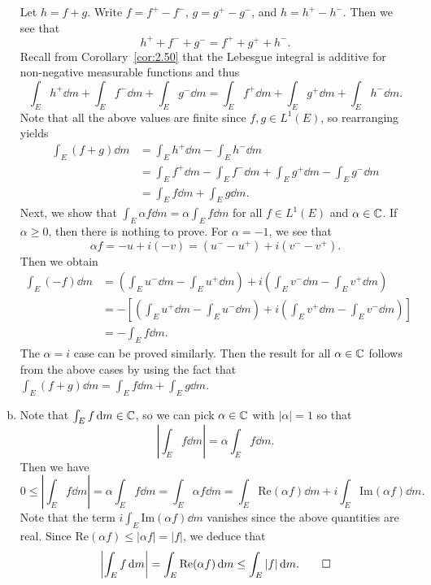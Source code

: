 \begin{pf}
\begin{enumerate}[(a)]
        Let $h = f + g$. Write $f = f^+ - f^-$, $g = g^+ - g^-$, and 
        $h = h^+ - h^-$. Then we see that 
        \[ h^+ + f^- + g^- = f^+ + g^+ + h^-. \]
        Recall from Corollary~\ref{cor:2.50} that the Lebesgue integral 
        is additive for non-negative measurable functions and thus 
        \[ \int_E h^+\dd m + \int_E f^-\dd m + \int_E g^- \dd m 
        = \int_E f^+\dd m + \int_E g^+\dd m + \int_E h^-\dd m. \] 
        Note that all the above values are finite since $f, g \in L^1(E)$, 
        so rearranging yields 
        \begin{align*}
            \int_E (f+g)\dd m 
            &= \int_E h^+\dd m - \int_E h^-\dd m \\
            &= \int_E f^+\dd m - \int_E f^-\dd m + \int_E g^+\dd m - \int_E g^-\dd m \\ 
            &= \int_E f\dd m + \int_E g\dd m.
        \end{align*}
        Next, we show that $\int_E \alpha f \dd m = \alpha \int_E f\dd m$
        for all $f \in L^1(E)$ and $\alpha \in \mathbb{C}$. If $\alpha \geq 0$, 
        then there is nothing to prove. For $\alpha = -1$, we see that 
        \[ \alpha f = -u + i(-v) = (u^- - u^+) + i(v^- - v^+). \] 
        Then we obtain 
        \begin{align*}
            \int_E (-f)\dd m 
            &= \left( \int_E u^-\dd m - \int_E u^+\dd m \right)
            + i\left( \int_E v^-\dd m - \int_E v^+\dd m \right) \\
            &= - \left[ \left( \int_E u^+\dd m - \int_E u^-\dd m \right)
            + i\left( \int_E v^+\dd m - \int_E v^-\dd m \right) \right] \\
            &= - \int_E f\dd m.
        \end{align*}
        The $\alpha = i$ case can be proved similarly. Then the result 
        for all $\alpha \in \mathbb{C}$ follows from the above cases by using the fact 
        that $\int_E (f+g)\dd m = \int_E f\dd m + \int_E g\dd m$. 

        \item Note that $\int_E f\,\mathrm{d} m \in \mathbb{C}$, so we can pick 
        $\alpha \in \mathbb{C}$ with $|\alpha| = 1$ so that 
        \[ \left| \int_E f\dd m \right| = \alpha \int_E f\dd m. \] 
        Then we have 
        \[ 0 \leq \left| \int_E f\dd m \right| = \alpha \int_E f\dd m 
        = \int_E \alpha f \dd m = \int_E \text{Re}(\alpha f)\dd m 
        + i \int_E \text{Im}(\alpha f)\dd m. \] 
        Note that the term $i \int_E \text{Im}(\alpha f)\dd m$ vanishes 
        since the above quantities are real. Since $\text{Re}(\alpha f)
        \leq |\alpha f| = |f|$, we deduce that 
        \[ \left| \int_E f\,\mathrm{d} m \right| = \int_E \text{Re}(\alpha f)\,\mathrm{d} m 
        \leq \int_E |f|\,\mathrm{d} m. \qedhere \] 
    \end{enumerate}
\end{pf}

